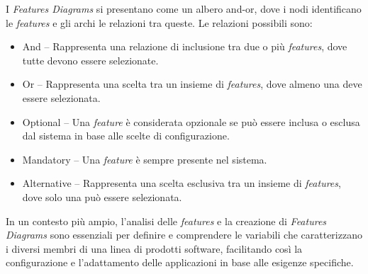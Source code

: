 \documentclass[12pt]{report}
\begin{document}
I \textit{Features Diagrams} si presentano come un albero and-or, dove i nodi identificano le \textit{features} e gli archi le relazioni tra queste. Le relazioni possibili sono:

\begin{itemize}
\item \textsf{And} -- Rappresenta una relazione di inclusione tra due o più \textit{features}, dove tutte devono essere selezionate.
\item \textsf{Or} -- Rappresenta una scelta tra un insieme di \textit{features}, dove almeno una deve essere selezionata.
\item \textsf{Optional} -- Una \textit{feature} è considerata opzionale se può essere inclusa o esclusa dal sistema in base alle scelte di configurazione.
\item \textsf{Mandatory} -- Una \textit{feature} è sempre presente nel sistema.
\item \textsf{Alternative} -- Rappresenta una scelta esclusiva tra un insieme di \textit{features}, dove solo una può essere selezionata.
\end{itemize}

In un contesto più ampio, l'analisi delle \textit{features} e la creazione di \textit{Features Diagrams} sono essenziali per definire e comprendere le variabili che caratterizzano i diversi membri di una linea di prodotti software, facilitando così la configurazione e l'adattamento delle applicazioni in base alle esigenze specifiche.
\end{document}
